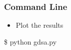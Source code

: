 \documentclass{beamer}
\begin{document}
\begin{frame}[fragile]\frametitle{Command Line}

\begin{itemize}
  \item Plot the results
\end{itemize}

\begin{semiverbatim}
\$ python gdsa.py
\end{semiverbatim}

\end{frame}

\end{document}
